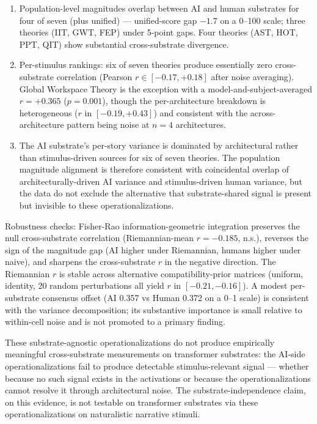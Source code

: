 \documentclass[11pt,a4paper]{article}
\begin{document}
\begin{enumerate}
  \item Population-level magnitudes overlap between AI and human substrates for four of seven (plus unified) --- unified-score gap $-1.7$ on a 0--100 scale; three theories (IIT, GWT, FEP) under 5-point gaps. Four theories (AST, HOT, PPT, QIT) show substantial cross-substrate divergence.
  \item Per-stimulus rankings: six of seven theories produce essentially zero cross-substrate correlation (Pearson $r \in [-0.17, +0.18]$ after noise averaging). Global Workspace Theory is the exception with a model-and-subject-averaged $r = +0.365$ ($p = 0.001$), though the per-architecture breakdown is heterogeneous ($r$ in $[-0.19, +0.43]$) and consistent with the across-architecture pattern being noise at $n = 4$ architectures.
  \item The AI substrate's per-story variance is dominated by architectural rather than stimulus-driven sources for six of seven theories. The population magnitude alignment is therefore consistent with coincidental overlap of architecturally-driven AI variance and stimulus-driven human variance, but the data do not exclude the alternative that substrate-shared signal is present but invisible to these operationalizations.
\end{enumerate}

Robustness checks: Fisher-Rao information-geometric integration preserves the null cross-substrate correlation (Riemannian-mean $r = -0.185$, n.s.), reverses the sign of the magnitude gap (AI higher under Riemannian, humans higher under naive), and sharpens the cross-substrate $r$ in the negative direction. The Riemannian $r$ is stable across alternative compatibility-prior matrices (uniform, identity, 20 random perturbations all yield $r$ in $[-0.21, -0.16]$). A modest per-substrate consensus offset (AI 0.357 vs Human 0.372 on a 0--1 scale) is consistent with the variance decomposition; its substantive importance is small relative to within-cell noise and is not promoted to a primary finding.

These substrate-agnostic operationalizations do not produce empirically meaningful cross-substrate measurements on transformer substrates: the AI-side operationalizations fail to produce detectable stimulus-relevant signal --- whether because no such signal exists in the activations or because the operationalizations cannot resolve it through architectural noise. The substrate-independence claim, on this evidence, is not testable on transformer substrates via these operationalizations on naturalistic narrative stimuli.
\end{document}
